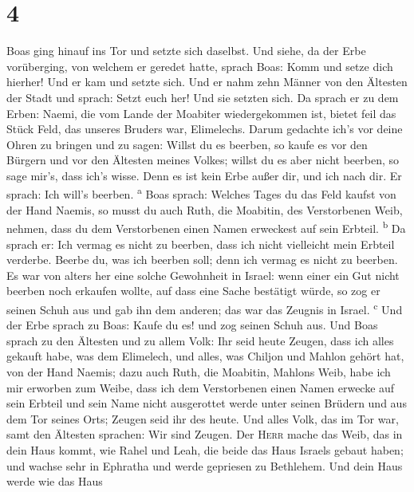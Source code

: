 \hypertarget{section-3}{%
\section{4}\label{section-3}}

 Boas ging hinauf ins Tor und setzte sich daselbst. Und
siehe, da der Erbe vorüberging, von welchem er geredet hatte, sprach
Boas: Komm und setze dich hierher! Und er kam und setzte sich.
 Und er nahm zehn Männer von den Ältesten der Stadt und
sprach: Setzt euch her! Und sie setzten sich.  Da sprach
er zu dem Erben: Naemi, die vom Lande der Moabiter wiedergekommen ist,
bietet feil das Stück Feld, das unseres Bruders war, Elimelechs.
 Darum gedachte ich's vor deine Ohren zu bringen und zu
sagen: Willst du es beerben, so kaufe es vor den Bürgern und vor den
Ältesten meines Volkes; willst du es aber nicht beerben, so sage mir's,
dass ich's wisse. Denn es ist kein Erbe außer dir, und ich nach dir. Er
sprach: Ich will's beerben. \textsuperscript{a}  Boas
sprach: Welches Tages du das Feld kaufst von der Hand Naemis, so musst
du auch Ruth, die Moabitin, des Verstorbenen Weib, nehmen, dass du dem
Verstorbenen einen Namen erweckest auf sein Erbteil. \textsuperscript{b}
 Da sprach er: Ich vermag es nicht zu beerben, dass ich
nicht vielleicht mein Erbteil verderbe. Beerbe du, was ich beerben soll;
denn ich vermag es nicht zu beerben.  Es war von alters
her eine solche Gewohnheit in Israel: wenn einer ein Gut nicht beerben
noch erkaufen wollte, auf dass eine Sache bestätigt würde, so zog er
seinen Schuh aus und gab ihn dem anderen; das war das Zeugnis in Israel.
\textsuperscript{c}  Und der Erbe sprach zu Boas: Kaufe du
es! und zog seinen Schuh aus.  Und Boas sprach zu den
Ältesten und zu allem Volk: Ihr seid heute Zeugen, dass ich alles
gekauft habe, was dem Elimelech, und alles, was Chiljon und Mahlon
gehört hat, von der Hand Naemis;  dazu auch Ruth, die
Moabitin, Mahlons Weib, habe ich mir erworben zum Weibe, dass ich dem
Verstorbenen einen Namen erwecke auf sein Erbteil und sein Name nicht
ausgerottet werde unter seinen Brüdern und aus dem Tor seines Orts;
Zeugen seid ihr des heute.  Und alles Volk, das im Tor
war, samt den Ältesten sprachen: Wir sind Zeugen. Der \textsc{Herr}
mache das Weib, das in dein Haus kommt, wie Rahel und Leah, die beide
das Haus Israels gebaut haben; und wachse sehr in Ephratha und werde
gepriesen zu Bethlehem.  Und dein Haus werde wie das Haus
